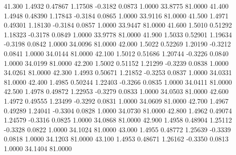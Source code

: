   41.300   1.4932   0.47867   1.17508  -0.3182   0.0873   1.0000  33.8775  81.0000
  41.400   1.4948   0.48390   1.17843  -0.3184   0.0865   1.0000  33.9116  81.0000
  41.500   1.4971   0.49301   1.18130  -0.3184   0.0857   1.0000  33.9447  81.0000
  41.600   1.5010   0.51292   1.18323  -0.3178   0.0849   1.0000  33.9778  81.0000
  41.900   1.5033   0.52901   1.19634  -0.3198   0.0842   1.0000  34.0096  81.0000
  42.000   1.5022   0.52269   1.20190  -0.3212   0.0841   1.0000  34.0144  81.0000
  42.100   1.5012   0.51686   1.20744  -0.3226   0.0840   1.0000  34.0199  81.0000
  42.200   1.5002   0.51152   1.21299  -0.3239   0.0838   1.0000  34.0261  81.0000
  42.300   1.4993   0.50671   1.21852  -0.3253   0.0837   1.0000  34.0331  81.0000
  42.400   1.4985   0.50244   1.22403  -0.3266   0.0835   1.0000  34.0411  81.0000
  42.500   1.4978   0.49872   1.22953  -0.3279   0.0833   1.0000  34.0503  81.0000
  42.600   1.4972   0.49555   1.23499  -0.3292   0.0831   1.0000  34.0609  81.0000
  42.700   1.4967   0.49289   1.24041  -0.3304   0.0828   1.0000  34.0730  81.0000
  42.800   1.4962   0.49074   1.24579  -0.3316   0.0825   1.0000  34.0868  81.0000
  42.900   1.4958   0.48904   1.25112  -0.3328   0.0822   1.0000  34.1024  81.0000
  43.000   1.4955   0.48772   1.25639  -0.3339   0.0818   1.0000  34.1203  81.0000
  43.100   1.4953   0.48671   1.26162  -0.3350   0.0813   1.0000  34.1404  81.0000
